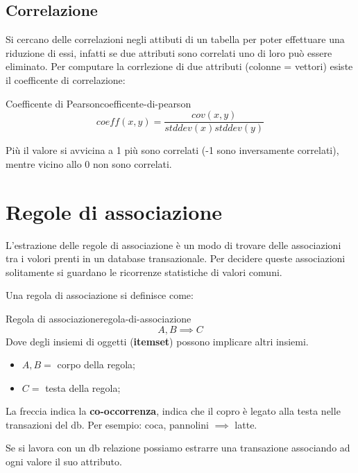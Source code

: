 \documentclass[12pt]{article}
\begin{document}
\subsection{Correlazione}
Si cercano delle correlazioni negli attibuti di un tabella per poter effettuare una riduzione di essi, infatti se due attributi sono correlati uno di loro pu\`o essere eliminato. Per computare la corrlezione di due attributi (colonne = vettori) esiste il coefficente di correlazione:
\begin{definition}{Coefficente di Pearson}{coefficente-di-pearson}
    \[ coeff(x, y) = \frac{cov(x, y)}{stddev(x) stddev(y)} \]
\end{definition}
Pi\`u il valore si avvicina a 1 pi\`u sono correlati (-1 sono inversamente correlati), mentre vicino allo 0 non sono correlati.


\newpage
\section{Regole di associazione}
L'estrazione delle regole di associazione \`e un modo di trovare delle associazioni tra i volori prenti in un database transazionale. Per decidere queste associazioni solitamente si guardano le ricorrenze statistiche di valori comuni.

Una regola di associazione si definisce come:
\begin{theorem}{Regola di associazione}{regola-di-associazione}
    \[ A, B \implies C \]
    Dove degli insiemi di oggetti (\textbf{itemset}) possono implicare altri insiemi.
    \begin{itemize}
        \item $A, B =$ corpo della regola;
        \item $C =$ testa della regola;
    \end{itemize}
    La freccia indica la \textbf{co-occorrenza}, indica che il copro \`e legato alla testa nelle transazioni del db. Per esempio: coca, pannolini $ \implies $ latte.
\end{theorem}

Se si lavora con un db relazione possiamo estrarre una transazione associando ad ogni valore il suo attributo.
\end{document}
